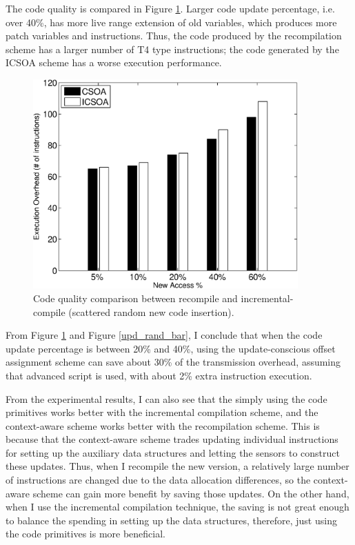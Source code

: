 The code quality is compared in Figure \ref{exe_rand_bar}. Larger code update percentage, i.e. over 40\%, has more live range extension of old variables, which produces more patch variables and instructions. Thus, the code produced by the recompilation scheme has a larger number of T4 type instructions; the code generated by the ICSOA scheme has a worse execution performance. 


\begin{figure}[htbp]
\begin{center}
\includegraphics[width=4in]{./figures/exe_rand_bar.eps}
\caption{Code quality comparison between recompile and incremental-compile (scattered random new code insertion).}
\label{exe_rand_bar}
\end{center}
\vspace{-0.2in}
\end{figure}


From Figure \ref{exe_rand_bar} and Figure \ref{upd_rand_bar}, I conclude that when the code update percentage is between 20\% and 40\%, using the update-conscious offset assignment scheme can save about 30\% of the transmission overhead, assuming that advanced script is used, with about 2\% extra instruction execution.


From the experimental results, I can also see that the simply using the code primitives works better with the incremental compilation scheme, and the context-aware scheme works better with the recompilation scheme.
This is because that the context-aware scheme trades updating individual instructions for setting up the auxiliary data structures and letting the sensors to construct these updates.
Thus, when I recompile the new version, a relatively large number of instructions are changed due to the data allocation differences, so the context-aware scheme can gain more benefit by saving those updates. 
On the other hand, when I use the incremental compilation technique, the saving is not great enough to balance the spending in setting up the data structures, therefore, just using the code primitives is more beneficial. 




